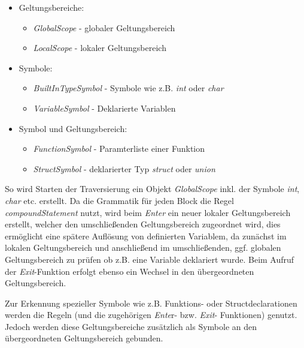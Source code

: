 \documentclass[]{lni}
\begin{document}
\begin{itemize}
	\item Geltungsbereiche:
	\begin{itemize}
		\item \textit{GlobalScope} - globaler Geltungsbereich
		\item \textit{LocalScope} - lokaler Geltungsbereich
	\end{itemize}
\end{itemize}
\begin{itemize}
	\item Symbole:
	\begin{itemize}
		\item \textit{BuiltInTypeSymbol} - Symbole wie z.B. \textit{int} oder \textit{char}
		\item \textit{VariableSymbol} - Deklarierte Variablen
	\end{itemize}
\end{itemize}

\begin{itemize}
	\item Symbol und Geltungsbereich:
	\begin{itemize}
		\item \textit{FunctionSymbol} - Paramterliste einer Funktion
		\item \textit{StructSymbol}	- deklarierter Typ \textit{struct} oder \textit{union}
	\end{itemize}	
\end{itemize}

So wird Starten der Traversierung ein Objekt \textit{GlobalScope} inkl. der Symbole \textit{int}, \textit{char} etc. erstellt. Da die Grammatik für jeden Block die Regel \textit{compoundStatement} nutzt, wird beim \textit{Enter} ein neuer lokaler Geltungsbereich erstellt, welcher den umschließenden Geltungsbereich zugeordnet wird, dies ermöglicht eine spätere Auflösung von definierten Variablem, da zunächst im lokalen Geltungsbereich und anschließend im umschließenden, ggf. globalen Geltungsbereich zu prüfen ob z.B. eine Variable deklariert wurde. Beim Aufruf der \textit{Exit}-Funktion erfolgt ebenso ein Wechsel in den übergeordneten Geltungsbereich.

Zur Erkennung spezieller Symbole wie z.B. Funktions- oder Structdeclarationen werden die Regeln (und die zugehörigen \textit{Ente}r- bzw. \textit{Exit}- Funktionen) genutzt. Jedoch werden diese Geltungsbereiche zusätzlich als Symbole an den übergeordneten Geltungsbereich gebunden.
\end{document}
